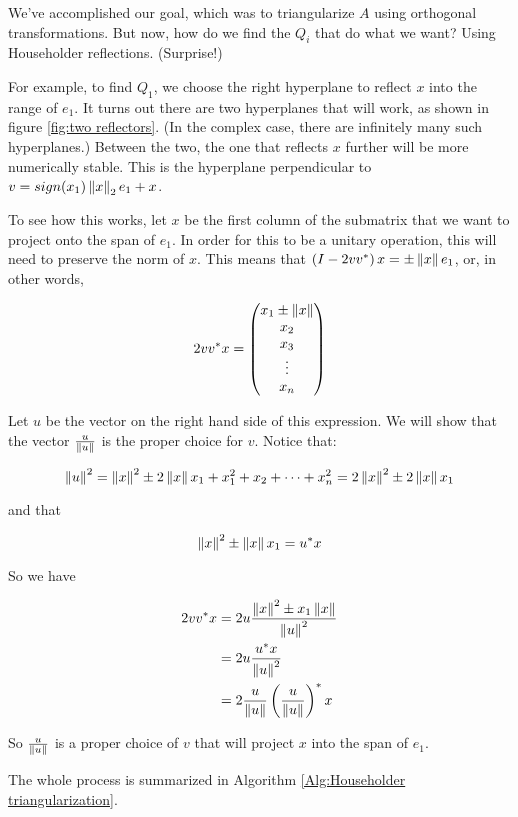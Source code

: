 We've accomplished our goal, which was to triangularize $A$ using orthogonal transformations.
But now, how do we find the $Q_i$ that do what we want? Using Householder reflections.
(Surprise!)

For example, to find $Q_1$, we choose the right hyperplane to reflect $x$ into the range of $e_1$.
It turns out there are two hyperplanes that will work, as shown in figure \ref{fig:two reflectors}.
(In the complex case, there are infinitely many such hyperplanes.)
Between the two, the one that reflects $x$ further will be more numerically stable.
This is the hyperplane perpendicular to \textbf{$v = sign(x_1)\left\lVert x\right\rVert_2 e_1 + x$}.

To see how this works, let $x$ be the first column of the submatrix that we want to project onto the span of $e_1$.
In order for this to be a unitary operation, this will need to preserve the norm of $x$.
This means that $\left( I - 2 v v^\ast \right) x = \pm \left\lVert x\right\rVert e_1$, or, in other words,

\[ 2 v v^\ast x =
\begin{pmatrix}
x_1 \pm \left\lVert x\right\rVert \\
x_2 \\
x_3 \\
\vdots \\
x_n
\end{pmatrix}\]

Let $u$ be the vector on the right hand side of this expression.
We will show that the vector $\frac{u}{\left\lVert u\right\rVert}$ is the proper choice for $v$.
Notice that:

\[\left\lVert u\right\rVert^2 = \left\lVert x\right\rVert^2 \pm 2 \left\lVert x\right\rVert x_1 + x_1^2 + x_2 + \dots + x_n^2 = 2 \left\lVert x\right\rVert^2 \pm 2 \left\lVert x\right\rVert x_1 \]

and that

\[\left\lVert x\right\rVert^2 \pm \left\lVert x\right\rVert x_1 = u^\ast x \]

So we have

\begin{align*}
2 v v^\ast x &= 2 u \frac{\left\lVert x\right\rVert^2 \pm x_1 \left\lVert x\right\rVert}{\left\lVert u\right\rVert^2} \\
		&= 2 u \frac{u^\ast x}{\left\lVert u\right\rVert^2} \\
		&= 2 \frac{u}{\left\lVert u\right\rVert} \left( \frac{u}{\left\lVert u\right\rVert} \right)^\ast x
\end{align*}

So $\frac{u}{\left\lVert u\right\rVert}$ is a proper choice of $v$ that will project $x$ into the span of $e_1$.

The whole process is summarized in Algorithm \ref{Alg:Householder triangularization}.


